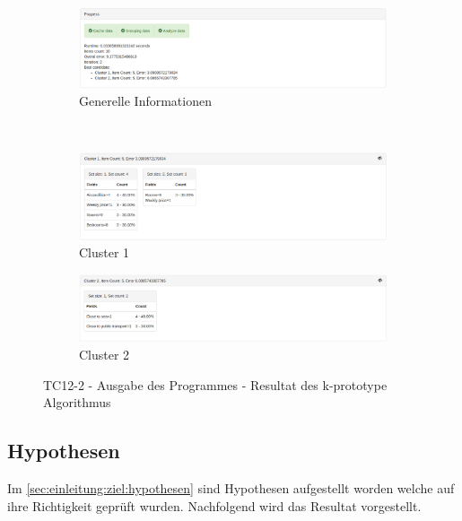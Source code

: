 \begin{figure}[H]
	\begin{subfigure}[t]{1\textwidth}
		\centering
		\includegraphics[width=1\textwidth]{images/tc12-kprototype-1}
		\caption{Generelle Informationen}
		\label{fig:testingfazit:testing:testcases:12-2-1}
	\end{subfigure} \\
	\begin{subfigure}[t]{1\textwidth}
		\centering
		\includegraphics[width=1\textwidth]{images/tc12-kprototype-2}
		\caption{Cluster 1}
		\label{fig:testingfazit:testing:testcases:12-2-2}
	\end{subfigure}
	\begin{subfigure}[t]{1\textwidth}
		\centering
		\includegraphics[width=1\textwidth]{images/tc12-kprototype-3}
		\caption{Cluster 2}
		\label{fig:testingfazit:testing:testcases:12-2-3}
	\end{subfigure}
	\caption{TC12-2 - Ausgabe des Programmes - Resultat des k-prototype Algorithmus}
	\label{fig:testingfazit:testing:testcases:12-2}
\end{figure}

\subsection{Hypothesen}
\label{sec:testingfazit:testing:hypothesen}
Im \cref{sec:einleitung:ziel:hypothesen}  sind Hypothesen aufgestellt worden welche auf ihre Richtigkeit geprüft wurden. Nachfolgend wird das Resultat vorgestellt.

